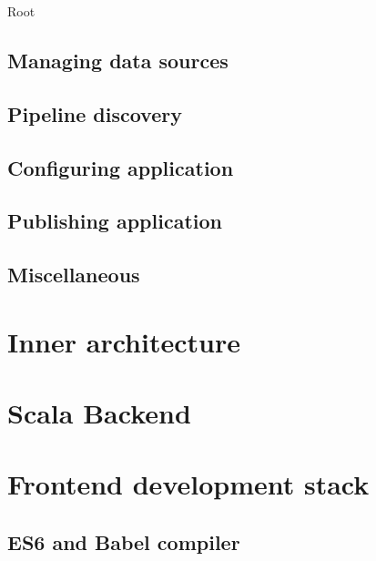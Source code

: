 Root

\subsection{Managing data sources}

\subsection{Pipeline discovery}

\subsection{Configuring application}

\subsection{Publishing application}

\subsection{Miscellaneous}


\section{Inner architecture}






\section{Scala Backend}






\section{Frontend development stack}

\subsection{ES6 and Babel compiler}

